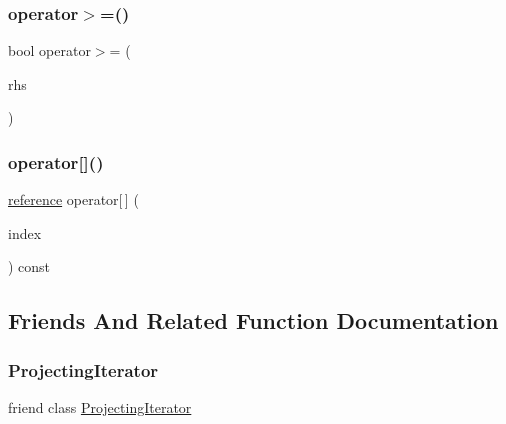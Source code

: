 \subsubsection{\texorpdfstring{operator$>$=()}{operator>=()}}
{\footnotesize\ttfamily bool operator$>$= (\begin{DoxyParamCaption}\item[{const \mbox{\hyperlink{classstanfordcpplib_1_1collections_1_1ProjectingIterator}{Projecting\+Iterator}}$<$ Other\+Itr $>$ \&}]{rhs }\end{DoxyParamCaption})\hspace{0.3cm}{\ttfamily [inline]}}

\mbox{\label{classstanfordcpplib_1_1collections_1_1ProjectingIterator_af8504b1545623760c8780ee24aa03d06}} 
\subsubsection{\texorpdfstring{operator[]()}{operator[]()}}
{\footnotesize\ttfamily \mbox{\hyperlink{classstanfordcpplib_1_1collections_1_1ProjectingIterator_ab734e7d93a20160ecd4ee87cec8336af}{reference}} operator\mbox{[}$\,$\mbox{]} (\begin{DoxyParamCaption}\item[{\mbox{\hyperlink{classstanfordcpplib_1_1collections_1_1ProjectingIterator_ad050e8e82b0962bb9ebd0e7c23b436ac}{difference\+\_\+type}}}]{index }\end{DoxyParamCaption}) const\hspace{0.3cm}{\ttfamily [inline]}}



\subsection{Friends And Related Function Documentation}
\mbox{\label{classstanfordcpplib_1_1collections_1_1ProjectingIterator_a140b3a0abc5ca187fb1e71464fb177c2}} 
\subsubsection{\texorpdfstring{Projecting\+Iterator}{ProjectingIterator}}
{\footnotesize\ttfamily friend class \mbox{\hyperlink{classstanfordcpplib_1_1collections_1_1ProjectingIterator}{Projecting\+Iterator}}\hspace{0.3cm}{\ttfamily [friend]}}

